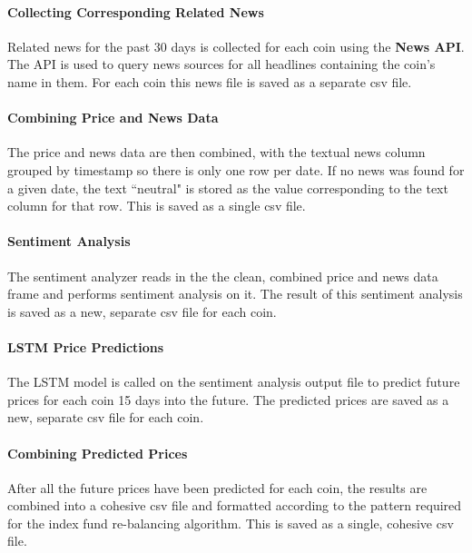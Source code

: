 \documentclass[10pt,twocolumn]{article}
\begin{document}
\paragraph{Collecting Corresponding Related News}

Related news for the past 30 days is collected for each coin using the \textbf{News API}. The API is used to query news sources for all headlines containing the coin's name in them. For each coin this news file is saved as a separate csv file.

\paragraph{Combining Price and News Data}

The price and news data are then combined, with the textual news column grouped by timestamp so there is only one row per date. If no news was found for a given date, the text ``neutral" is stored as the value corresponding to the text column for that row. This is saved as a single csv file.

\paragraph{Sentiment Analysis}

The sentiment analyzer reads in the the clean, combined price and news data frame and performs sentiment analysis on it. The result of this sentiment analysis is saved as a new, separate csv file for each coin.

\paragraph{LSTM Price Predictions}

The LSTM model is called on the sentiment analysis output file to predict future prices for each coin 15 days into the future. The predicted prices are saved as a new, separate csv file for each coin.

\paragraph{Combining Predicted Prices}

After all the future prices have been predicted for each coin, the results are combined into a cohesive csv file and formatted according to the pattern required for the index fund re-balancing algorithm. This is saved as a single, cohesive csv file.
\end{document}
